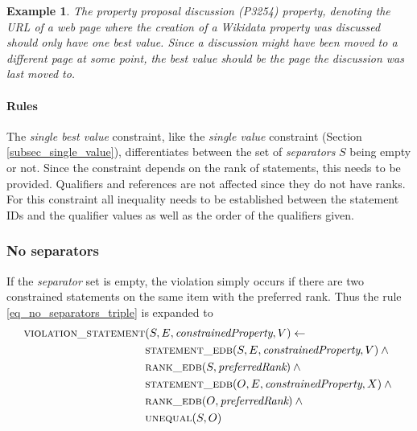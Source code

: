 \documentclass[hyperref,bachelorofscience,fleqn]{cgvpub}
\newtheorem{example}{Example}
\begin{document}
\begin{example}
The \emph{property proposal discussion} (P3254) property, denoting the URL of a web page where the creation of a Wikidata property was discussed should only have one best value. Since a discussion might have been moved to a different page at some point, the best value should be the page the discussion was last moved to.
\end{example}

\paragraph{Rules}
The \emph{single best value} constraint, like the \emph{single value} constraint (Section \ref{subsec_single_value}), differentiates between the set of \emph{separators} \(S\) being empty or not. Since the constraint depends on the rank of statements, this needs to be provided. Qualifiers and references are not affected since they do not have ranks. For this constraint all inequality needs to be established between the statement IDs and the qualifier values as well as the order of the qualifiers given.\\

\subsubsection{No separators}
If the \emph{separator} set is empty, the violation simply occurs if there are two constrained statements on the same item with the preferred rank. Thus the rule \eqref{eq_no_separators_triple} is expanded to
\begin{align}
\begin{split}
\textsc{violation\_statement}&(S, E, \emph{constrainedProperty}, V) \leftarrow \\
&\textsc{statement\_edb}(S, E, \emph{constrainedProperty}, V) \wedge{} \\
&\textsc{rank\_edb}(S, \emph{preferredRank}) \wedge{} \\
&\textsc{statement\_edb}(O, E, \emph{constrainedProperty}, X) \wedge{} \\
&\textsc{rank\_edb}(O, \emph{preferredRank}) \wedge{} \\
&\textsc{unequal}(S, O)
\end{split}
\end{align}
\end{document}
